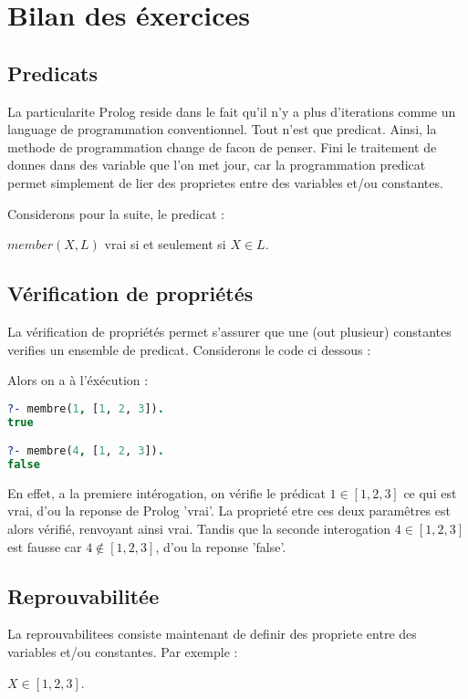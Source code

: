 
\chapter{Bilan des éxercices}

\section{Predicats}

La particularite Prolog reside dans le fait qu'il n'y a plus d'iterations comme
un language de programmation conventionnel. Tout n'est que predicat. Ainsi, la
methode de programmation change de facon de penser. Fini le traitement de donnes
dans des variable que l'on met jour, car la programmation predicat permet
simplement de lier des proprietes entre des variables et/ou constantes.

Considerons pour la suite, le predicat :
\begin{center}
$member(X, L)$ vrai si et seulement si $X \in L$.
\end{center}


\section{Vérification de propriétés}

La vérification de propriétés permet s'assurer que une (out plusieur) constantes
verifies un ensemble de predicat. Considerons le code ci dessous :

Alors on a à l'éxécution :

\begin{lstlisting}[language=Prolog]
?- membre(1, [1, 2, 3]).
true

?- membre(4, [1, 2, 3]).
false
\end{lstlisting}

En effet, a la premiere intérogation, on vérifie le prédicat $1 \in [1, 2, 3]$
ce qui est vrai, d'ou la reponse de Prolog 'vrai'. La proprieté etre ces deux
paramêtres est alors vérifié, renvoyant ainsi vrai. Tandis que la seconde
interogation $4 \in [1, 2, 3]$ est fausse car $4 \notin [1, 2, 3]$, d'ou la
reponse 'false'.


\section{Reprouvabilitée}

La reprouvabilitees consiste maintenant de definir des propriete entre des
variables et/ou constantes. Par exemple :
\begin{center}
$X \in [1, 2, 3]$.
\end{center}

